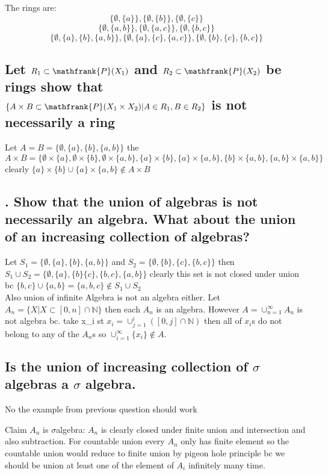 \documentclass[paper=letter, fontsize=11pt]{scrartcl} %
\begin{document}
The rings are:\\
$$\{\emptyset,\{a\}\},\{\emptyset,\{b\}\},\{\emptyset,\{c\}\}$$
$$\{\emptyset,\{a,b\}\},\{\emptyset,\{a,c\}\},\{\emptyset,\{b,c\}\}$$
$$\{\emptyset,\{a\},\{b\},\{a,b\}\},\{\emptyset,\{a\},\{c\},\{a,c\}\},\{\emptyset,\{b\},\{c\},\{b,c\}\}$$

\subsection{Let $R_1 \subset \mathfrank{P}(X_1)$ and $R_2 \subset \mathfrank{P}(X_2)$ be rings show that $\{A \times B \subset \mathfrank{P}(X_1 \times X_2) | A \in R_1, B \in R_2\}$ is not necessarily a ring}
Let $A=B=\{\emptyset,\{a\},\{b\},\{a,b\}\}$ the $A \times B=\{\emptyset \times \{a\},\emptyset \times \{b\},\emptyset \times \{a,b\},\{a\}\times \{b\},\{a\}\times \{a,b\},\{b\}\times \{a,b\},\{a,b\}\times \{a,b\}\}$ clearly $\{a\}\times \{b\} \cup \{a\}\times \{a,b\} \not \in A \times B$

\subsection{. Show that the union of algebras is not necessarily an algebra. What about the union of an increasing collection of algebras?}
 Let $S_1= \{\emptyset,\{a\},\{b\},\{a,b\}\}$ and $S_2=\{\emptyset,\{b\},\{c\},\{b,c\}\}$ then $S_1 \cup S_2= \{\emptyset,\{a\},\{b\}\{c\},\{b,c\},\{a,b\}\}$ clearly this set is not closed under union bc $\{b,c\}\cup \{a,b\} =\{a,b,c\} \not \in S_1 \cup S_2$
\\
Also union of infinite Algebra is not an algebra either. Let $A_n =\{X| X \subset [0,n] \cap \mathbb{N}\}$ then each $A_n$ is an algebra. However $A=\cup_{n=1} ^{\infty} A_n$ 
is not algebra bc.
take x_i st $x_i= \cup_{j=1} ^ i  ([0,j]\cap \mathbb{N})$ then all of $x_i$s do not belong to any of the $A_n$s so $\cup_{i=1} ^{\infty} \{x_i\} \not \in A $.


\subsection{Is the union of increasing collection of $\sigma$ algebras a $\sigma$ algebra.}
No the example from previous question should work \\

\begin{tcolorbox}
Claim $A_n$ is $\sigma$algebra:
$A_n$ is clearly closed under finite union and intersection and also subtraction. For countable union every $A_n$ only has finite element so the countable union would reduce to finite union by pigeon hole principle bc we should be union at least one of the element of $A_i$ infinitely many time. 
\end{tcolorbox}
\end{document}
